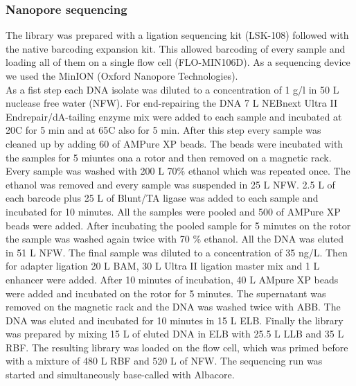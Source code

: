 \subsubsection{Nanopore sequencing}
The library was prepared with a ligation sequencing kit (LSK-108) followed with the native barcoding expansion kit. This allowed barcoding of every sample and loading all of them on a single flow cell (FLO-MIN106D). As a sequencing device we used the MinION (Oxford Nanopore Technologies). \\
As a fist step each DNA isolate was diluted to a concentration of 1 \textmu g/\textmu l in 50 \textmu L nuclease free water (NFW). For end-repairing the DNA 7 \textmu L NEBnext Ultra II Endrepair/dA-tailing enzyme mix were added to each
sample and incubated at 20\degree C for 5 min and at 65\degree C also for 5 min. After this step every sample was cleaned up by adding 60 \textmu of AMPure XP beads. The beads were incubated with the samples for 5 miuntes ona a rotor and then removed on a magnetic rack. Every sample was washed with 200 \textmu L 70\% ethanol which was repeated once. The ethanol was removed and every sample was suspended in 25 \textmu L NFW. 2.5 \textmu L of each barcode plus 25 \textmu L of Blunt/TA ligase was added to each sample and incubated for 10 minutes. All the samples were pooled and 500 \textmu of AMPure XP beads were added. After incubating the pooled sample for 5 minutes on the rotor the sample was washed again twice with 70 \% ethanol. All the DNA was eluted in 51 \textmu L NFW. The final sample was diluted to a concentration of 35 ng/\textmu L. Then for adapter ligation 20 \textmu L BAM, 30 \textmu L Ultra II ligation master mix and 1 \textmu L enhancer were added. After 10 minutes of incubation, 40 \textmu L AMpure XP beads were added and incubated on the rotor for 5 minutes. The supernatant was removed on the magnetic rack and the DNA was washed twice with ABB. The DNA was eluted and incubated for 10 minutes in 15 \textmu L ELB. Finally the library was prepared by mixing 15 \textmu L of eluted DNA in ELB with 25.5 \textmu L LLB and 35 \textmu L RBF. The resulting library was loaded on the flow cell, which was primed before with a mixture of 480 \textmu L RBF  and 520 \textmu L of NFW. The sequencing run was started and simultaneously base-called with Albacore. 


